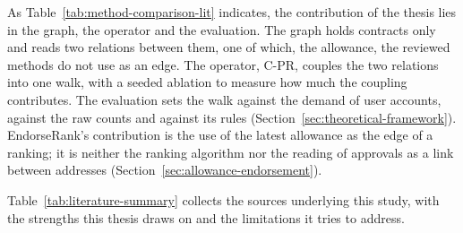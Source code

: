 As Table~\ref{tab:method-comparison-lit} indicates, the contribution of the thesis lies in the graph, the operator and the evaluation. The graph holds contracts only and reads two relations between them, one of which, the allowance, the reviewed methods do not use as an edge. The operator, \mbox{C-PR}, couples the two relations into one walk, with a seeded ablation to measure how much the coupling contributes. The evaluation sets the walk against the demand of user accounts, against the raw counts and against its rules (Section~\ref{sec:theoretical-framework}). EndorseRank's contribution is the use of the latest allowance as the edge of a ranking; it is neither the ranking algorithm nor the reading of approvals as a link between addresses (Section~\ref{sec:allowance-endorsement}).


Table~\ref{tab:literature-summary} collects the sources underlying this study, with the strengths this thesis draws on and the limitations it tries to address.

